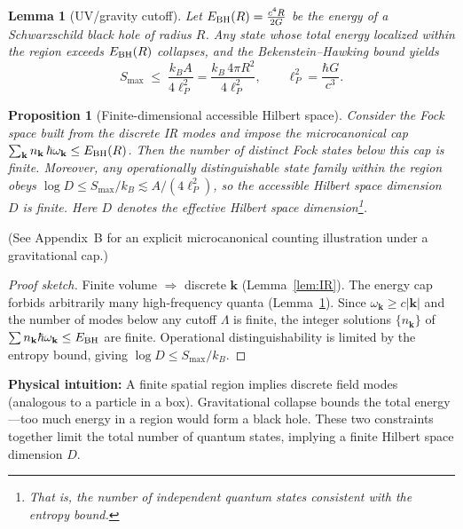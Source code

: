 \documentclass[12pt]{article}
\newcommand{\Smax}{S_{\max}}
\newtheorem{lemma}{Lemma}
\newtheorem{proposition}{Proposition}
\theoremstyle{remark}
\begin{document}
\begin{lemma}[UV/gravity cutoff]\label{lem:UV}
Let $E_{\rm BH}(R)=\frac{c^4 R}{2G}$ be the energy of a Schwarzschild black hole of radius $R$. 
Any state whose total energy localized within the region exceeds $E_{\rm BH}(R)$ collapses, and the
Bekenstein--Hawking bound yields
\begin{equation}
\Smax\;\le\; \frac{k_B A}{4\ell_P^2}
=\frac{k_B\,4\pi R^2}{4\ell_P^2},\qquad \ell_P^2=\frac{\hbar G}{c^3}.
\end{equation}
\end{lemma}

\begin{proposition}[Finite-dimensional accessible Hilbert space]\label{prop:finiteD}
Consider the Fock space built from the discrete IR modes and impose the microcanonical cap 
$\sum_{\mathbf{k}} n_{\mathbf{k}}\,\hbar\omega_{\mathbf{k}}\le E_{\rm BH}(R)$. 
Then the number of distinct Fock states below this cap is finite. 
Moreover, any operationally distinguishable state family within the region obeys 
$\log D \le \Smax/k_B \lesssim A/(4\ell_P^2)$, so the accessible Hilbert space dimension $D$ is finite. Here $D$ denotes the effective Hilbert space dimension\footnote{That is, the number of independent quantum states consistent with the entropy bound.}.

\end{proposition}
\noindent(See Appendix~B for an explicit microcanonical counting illustration under a gravitational cap.)

\begin{proof}[Proof sketch]
Finite volume $\Rightarrow$ discrete $\mathbf{k}$ (Lemma~\ref{lem:IR}). The energy cap forbids arbitrarily many high-frequency quanta (Lemma~\ref{lem:UV}). 
Since $\omega_{\mathbf{k}}\ge c|\mathbf{k}|$ and the number of modes below any cutoff $\Lambda$ is finite, the integer solutions 
$\{n_{\mathbf{k}}\}$ of $\sum n_{\mathbf{k}}\hbar\omega_{\mathbf{k}}\le E_{\rm BH}$ are finite. 
Operational distinguishability is limited by the entropy bound, giving $\log D \le \Smax/k_B$.
\end{proof}

\textbf{Physical intuition:} A finite spatial region implies discrete field modes (analogous to a particle in a box). 
Gravitational collapse bounds the total energy---too much energy in a region would form a black hole. 
These two constraints together limit the total number of quantum states, implying a finite Hilbert space dimension $D$.
\end{document}
